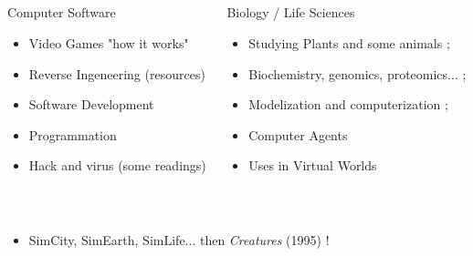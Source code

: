 \documentclass{beamer}
\begin{document}
\subsection{ \titleSubSectionFirstPartOne }
\begin{frame}
	\frametitle{ \titleSubSectionFirstPartOne }
	\begin{columns}[T]
	\begin{column}[T]{5.0cm}
		\begin{block}{Computer Software}
			\begin{itemize}
				\item Video Games \newline "how it works"
				\item Reverse Ingeneering \newline (resources)
				\item Software Development
				\item Programmation
				\item Hack and virus \newline (some readings)
			\end{itemize}
		\end{block}
	\end{column}
	\begin{column}[T]{5.0cm}
		\begin{block}{Biology / Life Sciences }
			\begin{itemize}
				\item Studying Plants and some animals ; 
				\item Biochemistry, genomics, proteomics...  ; 
				\item Modelization and computerization ; 
				\item Computer Agents 
				\item Uses in Virtual Worlds
			\end{itemize}
		\end{block}
	\end{column}
	\end{columns}~\\
	\begin{itemize}
		\item SimCity, SimEarth, SimLife... then \emph{Creatures} (1995) !
	\end{itemize}
\end{frame}

\def\titleSectionSecondPart{Next Steps (2000's)}
\end{document}
